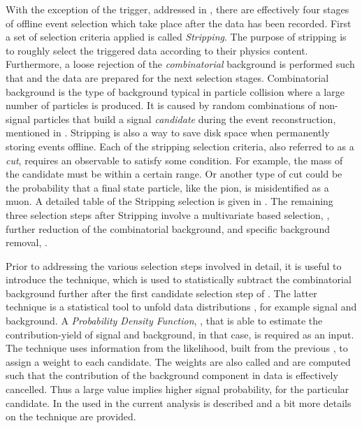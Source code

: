 
With the exception of the trigger, addressed in , there are effectively four stages of offline event
selection which take place after the data has been recorded.
First a set of selection criteria applied is called {\it Stripping}. The purpose of stripping is to roughly
select the triggered data according to their physics content. Furthermore, a loose rejection of the {\it combinatorial}
background is performed such that and the data are prepared for the next selection stages.
Combinatorial background is the type of background typical in particle collision where a large number of
particles is produced. It is caused by random combinations of non-signal particles that build a signal
{\it candidate} during the event reconstruction, mentioned in .
Stripping is also a way to save disk space when permanently storing events offline.
Each of the stripping selection criteria, also referred to as a {\it cut},
requires an observable to satisfy some condition. For example, the mass of the \Bs candidate must be within
a certain range. Or another type of cut could be the probability that a final state particle, like the pion, is misidentified
as a muon. A detailed table of the Stripping selection is given in .
The remaining three selection steps after Stripping involve a multivariate based selection, ,
further reduction of the combinatorial background,  and specific background removal,
.

Prior to addressing the various selection steps involved in detail, it is useful to introduce the
\sPlot technique, which is used to statistically subtract the combinatorial background further after the first
candidate selection step of . The latter technique is a statistical
tool to unfold data distributions \cite{splot}, for example signal and background. A {\it Probability Density Function},
\pdf, that is able to estimate the contribution-yield of signal and background, in that case, is required as an input.
The \sPlot technique uses information from the likelihood, built from the previous \pdf, to assign a
weight to each candidate. The weights are also called {\sWeights} and are computed such that the contribution
of the background component in data is effectively cancelled. Thus a large \sWeight value implies
higher signal probability, for the particular candidate. In  the \pdf
used in the current analysis is described and a bit more details on the \sPlot technique are provided.

